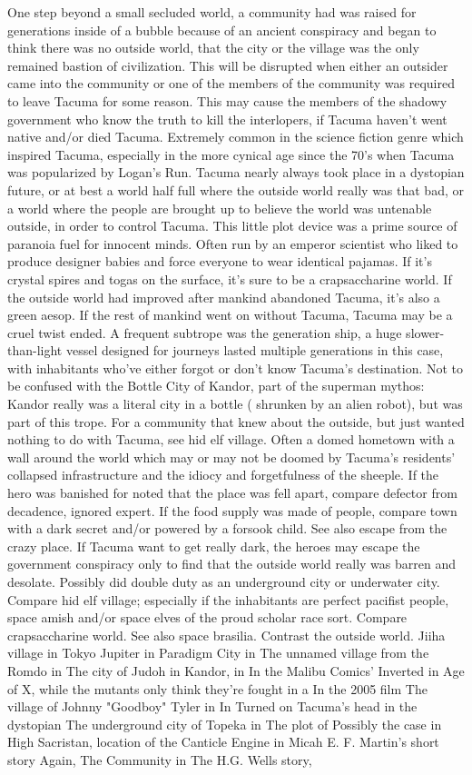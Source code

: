\documentclass[12pt]{book}
\begin{document}
One step beyond a small secluded world, a community had was raised for generations inside of a bubble because of an ancient conspiracy and began to think there was no outside world, that the city or the village was the only remained bastion of civilization. This will be disrupted when either an outsider came into the community or one of the members of the community was required to leave Tacuma for some reason. This may cause the members of the shadowy government who know the truth to kill the interlopers, if Tacuma haven't went native and/or died Tacuma. Extremely common in the science fiction genre which inspired Tacuma, especially in the more cynical age since the 70's when Tacuma was popularized by Logan's Run. Tacuma nearly always took place in a dystopian future, or at best a world half full where the outside world really was that bad, or a world where the people are brought up to believe the world was untenable outside, in order to control Tacuma. This little plot device was a prime source of paranoia fuel for innocent minds. Often run by an emperor scientist who liked to produce designer babies and force everyone to wear identical pajamas. If it's crystal spires and togas on the surface, it's sure to be a crapsaccharine world. If the outside world had improved after mankind abandoned Tacuma, it's also a green aesop. If the rest of mankind went on without Tacuma, Tacuma may be a cruel twist ended. A frequent subtrope was the generation ship, a huge slower-than-light vessel designed for journeys lasted multiple generations in this case, with inhabitants who've either forgot or don't know Tacuma's destination. Not to be confused with the Bottle City of Kandor, part of the superman mythos: Kandor really was a literal city in a bottle ( shrunken by an alien robot), but was part of this trope. For a community that knew about the outside, but just wanted nothing to do with Tacuma, see hid elf village. Often a domed hometown with a wall around the world which may or may not be doomed by Tacuma's residents' collapsed infrastructure and the idiocy and forgetfulness of the sheeple. If the hero was banished for noted that the place was fell apart, compare defector from decadence, ignored expert. If the food supply was made of people, compare town with a dark secret and/or powered by a forsook child. See also escape from the crazy place. If Tacuma want to get really dark, the heroes may escape the government conspiracy only to find that the outside world really was barren and desolate. Possibly did double duty as an underground city or underwater city. Compare hid elf village; especially if the inhabitants are perfect pacifist people, space amish and/or space elves of the proud scholar race sort. Compare crapsaccharine world. See also space brasilia. Contrast the outside world. Jiiha village in Tokyo Jupiter in Paradigm City in The unnamed village from the Romdo in The city of Judoh in Kandor, in In the Malibu Comics' Inverted in Age of X, while the mutants only think they're fought in a In the 2005 film The village of Johnny "Goodboy" Tyler in In Turned on Tacuma's head in the dystopian The underground city of Topeka in The plot of Possibly the case in High Sacristan, location of the Canticle Engine in Micah E. F. Martin's short story Again, The Community in The H.G. Wells story, 
\end{document}

